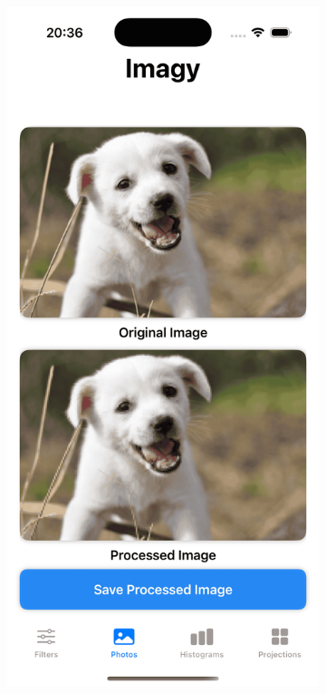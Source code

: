 \documentclass[a4paper]{article}
\begin{document}
\begin{figure}[H]
    \centering
    \begin{subfigure}{0.2\textwidth}
        \centering
        \includegraphics[width=\linewidth]{images/dog_mosaic_2.png}

\end{subfigure}
\end{figure}
\end{document}
